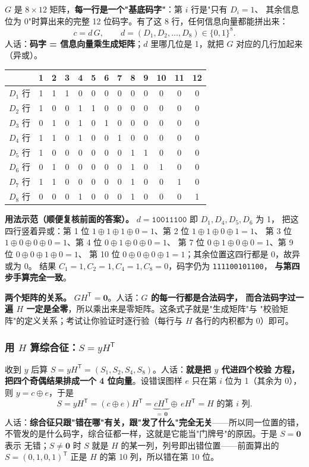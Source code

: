 $G$ 是 $8\times12$ 矩阵，\textbf{每一行是一个"基底码字"}：第 $i$ 行是"只有 $D_i=1$、
其余信息位为 0"时算出来的完整 12 位码字。有了这 8 行，任何信息向量都能拼出来：
\[
c=d\,G,\qquad d=(D_1,D_2,\dots,D_8)\in\{0,1\}^{8}.
\]
人话：\textbf{码字 = 信息向量乘生成矩阵}；$d$ 里哪几位是 1，就把 $G$ 对应的几行加起来（异或）。

\begin{center}\small
\setlength{\tabcolsep}{4pt}
\begin{tabular}{@{}c*{12}{c}@{}}
\toprule
 & 1&2&3&4&5&6&7&8&9&10&11&12\\
\midrule
$D_1$ 行 & 1&1&1&0&0&0&0&0&0&0&0&0\\
$D_2$ 行 & 1&0&0&1&1&0&0&0&0&0&0&0\\
$D_3$ 行 & 0&1&0&1&0&1&0&0&0&0&0&0\\
$D_4$ 行 & 1&1&0&1&0&0&1&0&0&0&0&0\\
$D_5$ 行 & 1&0&0&0&0&0&0&1&1&0&0&0\\
$D_6$ 行 & 0&1&0&0&0&0&0&1&0&1&0&0\\
$D_7$ 行 & 1&1&0&0&0&0&0&1&0&0&1&0\\
$D_8$ 行 & 0&0&0&1&0&0&0&1&0&0&0&1\\
\bottomrule
\end{tabular}
\end{center}

\textbf{用法示范（顺便复核前面的答案）。} $d=\texttt{10011100}$ 即 $D_1,D_4,D_5,D_6$ 为 1，
把这四行竖着异或：第 1 位 $1\oplus1\oplus1\oplus0=1$、第 2 位 $1\oplus1\oplus0\oplus1=1$、
第 3 位 $1\oplus0\oplus0\oplus0=1$、第 4 位 $0\oplus1\oplus0\oplus0=1$、
第 7 位 $0\oplus1\oplus0\oplus0=1$、第 9 位 $0\oplus0\oplus1\oplus0=1$、
第 10 位 $0\oplus0\oplus0\oplus1=1$；其余位置这四行都是 0，故异或为 0。
结果 $C_1=1,C_2=1,C_4=1,C_8=0$，码字仍为 \texttt{111100101100}，
\textbf{与第四步手算完全一致}。

\textbf{两个矩阵的关系。} $GH^{\mathsf T}=\mathbf{0}$。人话：\textbf{$G$ 的每一行都是合法码字，
而合法码字过一遍 $H$ 一定是全零}，所以乘出来是零矩阵。这条式子就是"生成矩阵"与
"校验矩阵"的定义关系；考试让你验证时逐行验（每行与 $H$ 各行的内积都为 0）即可。

\subsubsection{用 $H$ 算综合征：$S=yH^{\mathsf T}$}

收到 $y$ 后算 $S=yH^{\mathsf T}=(S_1,S_2,S_4,S_8)$。人话：\textbf{就是把 $y$ 代进四个校验
方程，把四个奇偶结果排成一个 4 位向量}。设错误图样 $e$ 只在第 $i$ 位为 1（其余为 0），
则 $y=c\oplus e$，于是
\[
S=yH^{\mathsf T}=(c\oplus e)H^{\mathsf T}
=\underbrace{cH^{\mathsf T}}_{=\,\mathbf{0}}\oplus\,eH^{\mathsf T}
=H\text{ 的第 }i\text{ 列}.
\]
人话：\textbf{综合征只跟"错在哪"有关，跟"发了什么"完全无关}——所以同一位置的错，
不管发的是什么码字，综合征都一样，这就是它能当"门牌号"的原因。于是 $S=\mathbf{0}$ 表示
无错；$S\ne\mathbf{0}$ 时 $S$ 就是 $H$ 的某一列，列号即出错位置——前面算出的
$S=(0,1,0,1)^{\mathsf T}$ 正是 $H$ 的第 10 列，所以错在第 10 位。

